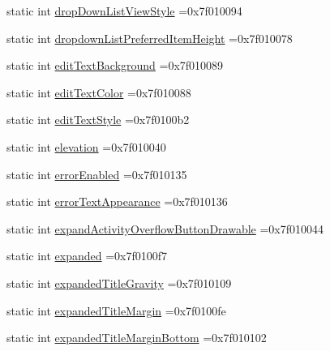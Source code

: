 \begin{DoxyCompactItemize}
\item 
static int \hyperlink{classandroid_1_1support_1_1v7_1_1mediarouter_1_1R_1_1attr_a6f8a3a2e0500edd730fb01e396a74907}{drop\+Down\+List\+View\+Style} =0x7f010094
\item 
static int \hyperlink{classandroid_1_1support_1_1v7_1_1mediarouter_1_1R_1_1attr_ab6e7f467aeb2525aa806ff1e7a9c3a4c}{dropdown\+List\+Preferred\+Item\+Height} =0x7f010078
\item 
static int \hyperlink{classandroid_1_1support_1_1v7_1_1mediarouter_1_1R_1_1attr_af7eacd6e8195cfde4becb505c6a07dc5}{edit\+Text\+Background} =0x7f010089
\item 
static int \hyperlink{classandroid_1_1support_1_1v7_1_1mediarouter_1_1R_1_1attr_a543f76d56c48cfda37713fbce258c6f1}{edit\+Text\+Color} =0x7f010088
\item 
static int \hyperlink{classandroid_1_1support_1_1v7_1_1mediarouter_1_1R_1_1attr_a0c95d2cc5d88bdc8040dd1c8bf764a38}{edit\+Text\+Style} =0x7f0100b2
\item 
static int \hyperlink{classandroid_1_1support_1_1v7_1_1mediarouter_1_1R_1_1attr_ab1ec64066729d67ab6ae697dc2178d06}{elevation} =0x7f010040
\item 
static int \hyperlink{classandroid_1_1support_1_1v7_1_1mediarouter_1_1R_1_1attr_a81a698eb10c6fa3e9765f39b03bff723}{error\+Enabled} =0x7f010135
\item 
static int \hyperlink{classandroid_1_1support_1_1v7_1_1mediarouter_1_1R_1_1attr_a5c73f4d61559470e6b21c11c6d850bc4}{error\+Text\+Appearance} =0x7f010136
\item 
static int \hyperlink{classandroid_1_1support_1_1v7_1_1mediarouter_1_1R_1_1attr_ad172cad171d05a0da03a6b639907da78}{expand\+Activity\+Overflow\+Button\+Drawable} =0x7f010044
\item 
static int \hyperlink{classandroid_1_1support_1_1v7_1_1mediarouter_1_1R_1_1attr_a03cd232d62bb29f337ad465e753df1e6}{expanded} =0x7f0100f7
\item 
static int \hyperlink{classandroid_1_1support_1_1v7_1_1mediarouter_1_1R_1_1attr_a5381034a891461ad50ed45590ebf8679}{expanded\+Title\+Gravity} =0x7f010109
\item 
static int \hyperlink{classandroid_1_1support_1_1v7_1_1mediarouter_1_1R_1_1attr_a094d5abacdb04db8db3be458fef1e774}{expanded\+Title\+Margin} =0x7f0100fe
\item 
static int \hyperlink{classandroid_1_1support_1_1v7_1_1mediarouter_1_1R_1_1attr_ad6238ed40f45c1ed7c04c31149a75682}{expanded\+Title\+Margin\+Bottom} =0x7f010102
\item 

\end{DoxyCompactItemize}
